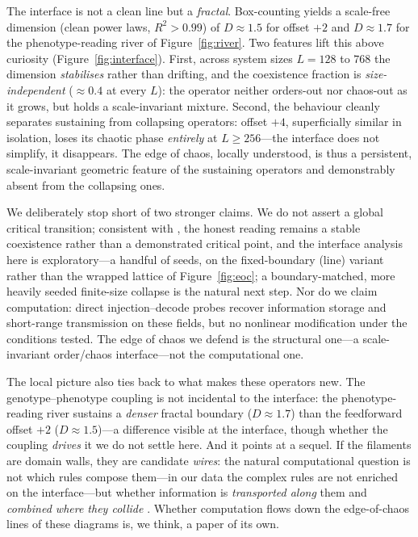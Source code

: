 \documentclass[man,12pt,floatsintext]{apa7}
\newcommand{\secref}[1]{\emph{\nameref{#1}}}
\begin{document}
The interface is not a clean line but a \emph{fractal}. Box-counting yields a
scale-free dimension (clean power laws, $R^2 > 0.99$) of $D \approx 1.5$ for
offset $+2$ and $D \approx 1.7$ for the phenotype-reading river of
Figure~\ref{fig:river}. Two features lift this above curiosity
(Figure~\ref{fig:interface}). First, across system sizes $L = 128$ to $768$ the
dimension \emph{stabilises} rather than drifting, and the coexistence fraction
is \emph{size-independent} ($\approx 0.4$ at every $L$): the operator neither
orders-out nor chaos-out as it grows, but holds a scale-invariant mixture.
Second, the behaviour cleanly separates sustaining from collapsing operators:
offset $+4$, superficially similar in isolation, loses its chaotic phase
\emph{entirely} at $L \ge 256$---the interface does not simplify, it disappears.
The edge of chaos, locally understood, is thus a persistent, scale-invariant
geometric feature of the sustaining operators and demonstrably absent from the
collapsing ones.

We deliberately stop short of two stronger claims. We do not assert a global
critical transition; consistent with \secref{sec:limits}, the honest
reading remains a stable coexistence rather than a demonstrated critical point,
and the interface analysis here is exploratory---a handful of seeds, on the
fixed-boundary (line) variant rather than the wrapped lattice of
Figure~\ref{fig:eoc}; a boundary-matched, more heavily seeded finite-size
collapse is the natural next step. Nor do we claim computation: direct
injection--decode probes recover information storage and short-range
transmission on these fields, but no nonlinear modification under the conditions
tested. The edge of chaos we defend is the structural one---a scale-invariant
order/chaos interface---not the computational one.

The local picture also ties back to what makes these operators new. The
genotype--phenotype coupling is not incidental to the interface: the
phenotype-reading river sustains a \emph{denser} fractal boundary
($D \approx 1.7$) than the feedforward offset $+2$ ($D \approx 1.5$)---a
difference visible at the interface, though whether the coupling \emph{drives}
it we do not settle here. And it points at a sequel.
If the filaments are domain walls, they are candidate \emph{wires}: the natural
computational question is not which rules compose them---in our data the complex
rules are not enriched on the interface---but whether information is
\emph{transported along} them and \emph{combined where they collide}
\parencite{mitchell1993revisiting}. Whether computation flows down the
edge-of-chaos lines of these diagrams is, we think, a paper of its own.
\end{document}

